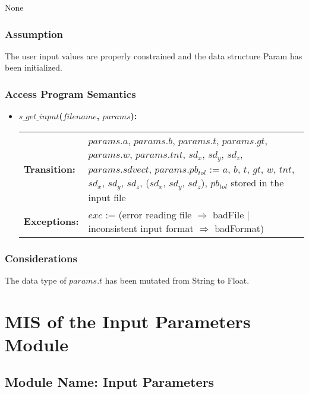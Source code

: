 \documentclass[12pt]{article}
\begin{document}
None

\subsubsection{Assumption}

The user input values are properly constrained and the data structure Param has been initialized.

\subsubsection{Access Program Semantics}

\begin{itemize}
\item\textbf{$s\_get\_input$($filename$, $params$):} \\ \newline
\begin{tabular}{l p{}}
\textbf{Transition:} & $params.a$, $params.b$, $params.t$, $params.gt$, 
$params.w$, $params.tnt$, $sd_{x}$, $sd_{y}$, $sd_{z}$, $params.sdvect$,
$params.pb_{tol}$ := $a$, $b$, $t$, $gt$, $w$, $tnt$, $sd_{x}$, $sd_{y}$, 
$sd_{z}$, ($sd_{x}$, $sd_{y}$, $sd_{z}$), $pb_{tol}$ stored in the input file  \\
\textbf{Exceptions:} & $exc$ := \newline
(error reading file $\Rightarrow$ badFile \newline $|$ inconsistent input format $\Rightarrow$ badFormat)\\
\end{tabular}
\end{itemize}

\subsubsection{Considerations}

The data type of $params.t$ has been mutated from String to Float.


\section{MIS of the Input Parameters Module} \label{SecInP}

\subsection{Module Name: Input Parameters}
\end{document}
